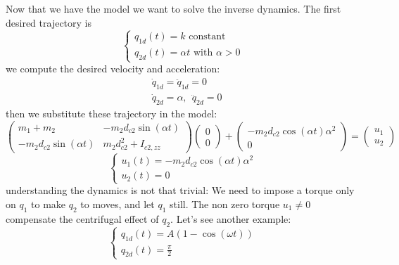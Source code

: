 \documentclass[10pt, a4paper]{report}
\begin{document}
\noindent Now that we have the model we want to solve the inverse dynamics. The first desired trajectory is\begin{equation}
    \begin{cases}
        q_{1d}(t)=k \text{ constant}\\ 
        q_{2d}(t)=\alpha t\text{ with }\alpha >0
    \end{cases}
\end{equation}
we compute the desired velocity and acceleration:\begin{align}
    &\dot q_{1d}=\ddot q_{1d}=0\\ 
    &\dot q_{2d}=\alpha, \ \ \ddot q_{2d}=0
\end{align}
then we substitute these trajectory in the model:\begin{equation}
    \begin{pmatrix}
        m_1+m_2 & -m_2d_{c2}\sin (\alpha t)\\ 
       -m_2d_{c2}\sin (\alpha t)& m_2d_{c2}^2+I_{c2,zz}
    \end{pmatrix}\begin{pmatrix}
       0\\ 0
    \end{pmatrix}+\begin{pmatrix}
       -m_2d_{c2}\cos (\alpha t)\alpha^2 \\ 0
    \end{pmatrix}=\begin{pmatrix}
        u_1\\ u_2
    \end{pmatrix}
\end{equation}
\begin{equation}
    \begin{cases}
        u_1(t)=-m_2d_{c2}\cos(\alpha t)\alpha^2 \\ 
        u_2(t)=0
    \end{cases}
\end{equation}
understanding the dynamics is not that trivial: We need to impose a torque only on $q_1$ to make $q_2$ to moves, and let $q_1$ still. The non zero torque $u_1\ne 0$ compensate the centrifugal effect of $q_2$. Let's see another example:\begin{equation}
    \begin{cases}
        q_{1d}(t)=A(1-\cos(\omega t))\\ 
        q_{2d}(t)=\frac{\pi}{2}
    \end{cases}
\end{equation}
\end{document}
